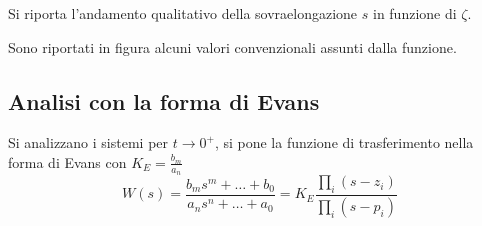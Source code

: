 Si riporta l'andamento qualitativo della sovraelongazione $s$ in funzione di
$\zeta$.
\begin{figure}[h]
 \centering
\end{figure}
Sono riportati in figura alcuni valori convenzionali assunti dalla funzione.

\newpage
\subsection{Analisi con la forma di Evans}
Si analizzano i sistemi per $t\to 0^+$, si pone la funzione di trasferimento
nella forma di Evans con $K_E=\frac{b_m}{a_n}$
$$
W(s) = \frac{b_ms^m + \ldots + b_0}{a_ns^n + \ldots + a_0} =
K_E\frac{\prod_i(s-z_i)}{\prod_i (s-p_i)}
$$

